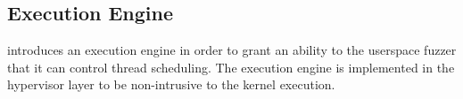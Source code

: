 









\subsection{Execution Engine}
\label{ss:engine}

\sys introduces an execution engine in order to grant an ability to
the userspace fuzzer that it can control thread scheduling.
%
The execution engine is implemented in the hypervisor layer to be
non-intrusive to the kernel execution.




